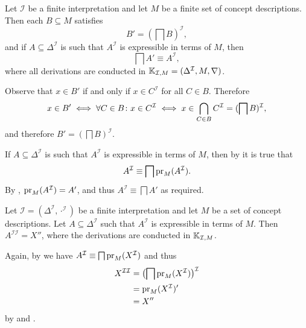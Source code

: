 \begin{Proposition}
  \label{prop:connection-I-prime-2}
  Let $\mathcal{I}$ be a finite interpretation and let $M$ be a finite set of concept
  descriptions.  Then each $B \subseteq M$ satisfies
  \begin{equation*}
    B' = (\bigsqcap B)^{\mathcal{I}},
  \end{equation*}
  and if $A \subseteq \Delta^{\mathcal{I}}$ is such that $A^{\mathcal{I}}$ is expressible
  in terms of $M$, then
  \begin{equation*}
    \bigsqcap A' \equiv A^{\mathcal{I}},
  \end{equation*}
  where all derivations are conducted in ${\mathbb{K}}_{\mathcal{I}, M} = (\Delta^{\mathcal{I}},
  M, \nabla)$.
\end{Proposition}
\begin{Proof}
  Observe that $x \in B'$ if and only if $x \in C^{\mathcal{I}}$ for all $C \in B$.
  Therefore
  \begin{equation*}
    x \in B' \iff \forall C \in B \colon x \in C^{\mathcal{I}} \iff x \in \bigcap_{C \in
      B} C^{\mathcal{I}} = (\bigsqcap B)^{\mathcal{I}},
  \end{equation*}
  and therefore $B' = (\bigsqcap B)^{\mathcal{I}}$.

  If $A \subseteq \Delta^{\mathcal{I}}$ is such that $A^{\mathcal{I}}$ is expressible in
  terms of $M$, then by  it is true that
  \begin{equation*}
    A^{\mathcal{I}} \equiv \bigsqcap \operatorname{pr}_M(A^{\mathcal{I}}).
  \end{equation*}
  By , $\operatorname{pr}_M(A^{\mathcal{I}}) = A'$, and thus
  $A^{\mathcal{I}} \equiv \bigsqcap A'$ as required.
\end{Proof}

\begin{Proposition}
  \label{prop:connection-I-prime-3}
  Let $\mathcal{I} = (\Delta^{\mathcal{I}}, \cdot^{\mathcal{I}})$ be a finite
  interpretation and let $M$ be a set of concept descriptions.  Let $A \subseteq
  \Delta^{\mathcal{I}}$ such that $A^{\mathcal{I}}$ is expressible in terms of $M$.  Then
  $A^{\mathcal{I}\mathcal{I}} = X''$, where the derivations are conducted in ${\mathbb{K}}_{\mathcal{I}, M}$.
\end{Proposition}
\begin{Proof}
  Again, by  we have $A^{\mathcal{I}}
  \equiv \bigsqcap \operatorname{pr}_M(X^{\mathcal{I}})$ and thus
  \begin{align*}
    X^{\mathcal{I}\mathcal{I}}
    &= \bigl(\bigsqcap \operatorname{pr}_M(X^{\mathcal{I}})\bigr)^{\mathcal{I}} \\
    &= \operatorname{pr}_M(X^{\mathcal{I}})' \\
    &= X''
  \end{align*}
  by  and .
\end{Proof}

